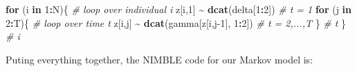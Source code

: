 \documentclass[
  12pt,
]{krantz}
\newenvironment{Shaded}{\begin{snugshade}}{\end{snugshade}}
\newcommand{\CommentTok}[1]{\textcolor[rgb]{0.56,0.35,0.01}{\textit{#1}}}
\newcommand{\ControlFlowTok}[1]{\textcolor[rgb]{0.13,0.29,0.53}{\textbf{#1}}}
\newcommand{\DecValTok}[1]{\textcolor[rgb]{0.00,0.00,0.81}{#1}}
\newcommand{\FunctionTok}[1]{\textcolor[rgb]{0.13,0.29,0.53}{\textbf{#1}}}
\newcommand{\NormalTok}[1]{#1}
\newcommand{\SpecialCharTok}[1]{\textcolor[rgb]{0.81,0.36,0.00}{\textbf{#1}}}
\begin{document}
\begin{Shaded}
\begin{Highlighting}[]
\ControlFlowTok{for}\NormalTok{ (i }\ControlFlowTok{in} \DecValTok{1}\SpecialCharTok{:}\NormalTok{N)\{ }\CommentTok{\# loop over individual i}
\NormalTok{  z[i,}\DecValTok{1}\NormalTok{] }\SpecialCharTok{\textasciitilde{}} \FunctionTok{dcat}\NormalTok{(delta[}\DecValTok{1}\SpecialCharTok{:}\DecValTok{2}\NormalTok{]) }\CommentTok{\# t = 1}
  \ControlFlowTok{for}\NormalTok{ (j }\ControlFlowTok{in} \DecValTok{2}\SpecialCharTok{:}\NormalTok{T)\{ }\CommentTok{\# loop over time t}
\NormalTok{    z[i,j] }\SpecialCharTok{\textasciitilde{}} \FunctionTok{dcat}\NormalTok{(gamma[z[i,j}\DecValTok{{-}1}\NormalTok{], }\DecValTok{1}\SpecialCharTok{:}\DecValTok{2}\NormalTok{]) }\CommentTok{\# t = 2,...,T}
\NormalTok{  \} }\CommentTok{\# t}
\NormalTok{\} }\CommentTok{\# i}
\end{Highlighting}
\end{Shaded}

Puting everything together, the NIMBLE code for our Markov model is:
\end{document}
